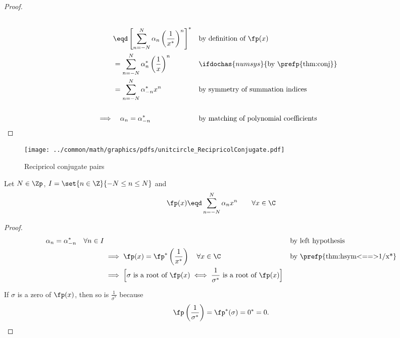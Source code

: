 \begin{proof}
\begin{align*}
  \\&\eqd\left[
           \sum_{n=-N}^N \alpha_n    \left(\frac{1}{x^\ast}\right)^n
         \right]^\ast
    &&   \text{by definition of $\fp(x)$}
  \\&=   \sum_{n=-N}^N \alpha_n^\ast \left(\frac{1}{x}\right)^n
    &&   \ifdochas{numsys}{\text{by \prefp{thm:conj}}}
  \\&=   \sum_{n=-N}^N \alpha_{-n}^\ast x^{n}
    &&   \text{by symmetry of summation indices}
  \\ \\
  \implies
    &\quad \alpha_n=\alpha_{-n}^\ast
    &&   \text{by matching of polynomial coefficients}
\end{align*}
\end{proof}

\begin{figure}
  \centering
  \texttt{[image: ../common/math/graphics/pdfs/unitcircle\_RecipricolConjugate.pdf]}
  \caption{Recipricol conjugate pairs}
\end{figure}

\begin{theorem}
\label{thm:hsym==>rconj}
Let $N\in\Zp$, $I=\set{n\in\Z}{-N\le n\le N}$ and
  \[ \fp(x) \eqd \sum_{n=-N}^N \alpha_n x^n  \qquad \forall x\in\C \]
\end{theorem}
\begin{proof}
\begin{align*}
  \alpha_n = \alpha_{-n}^\ast \quad \forall n\in I
    &&& \text{by left hypothesis}
  \\&\implies \fp(x) = \fp^\ast\left(\frac{1}{x^\ast}\right)  \quad \forall x\in\C
    && \text{by \prefp{thm:hsym<==>1/x*}}
  \\&\implies
    \Big[
    \sigma \text{ is a root of }\fp(x)
    \iff
    \frac{1}{\sigma^\ast} \text{ is a root of }\fp(x)
    \Big]
\end{align*}

If $\sigma$ is a zero of $\fp(x)$,
then so is $\frac{1}{\sigma^\ast}$ because
\[ \fp\left(\frac{1}{\sigma^\ast}\right) = \fp^\ast(\sigma) = 0^\ast = 0.\]
\end{proof}




